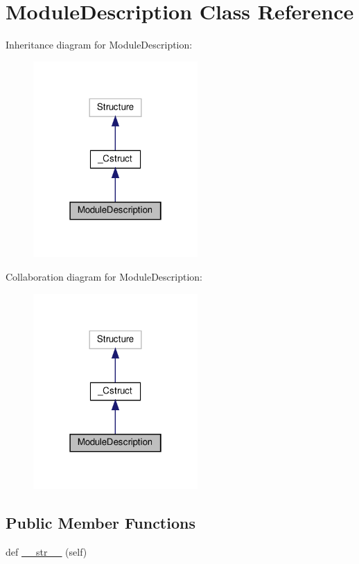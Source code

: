 \hypertarget{classvlc_1_1_module_description}{}\section{Module\+Description Class Reference}
\label{classvlc_1_1_module_description}


Inheritance diagram for Module\+Description\+:
\nopagebreak
\begin{figure}[H]
\begin{center}
\leavevmode
\includegraphics[width=178pt]{classvlc_1_1_module_description__inherit__graph}
\end{center}
\end{figure}


Collaboration diagram for Module\+Description\+:
\nopagebreak
\begin{figure}[H]
\begin{center}
\leavevmode
\includegraphics[width=178pt]{classvlc_1_1_module_description__coll__graph}
\end{center}
\end{figure}
\subsection*{Public Member Functions}
\begin{DoxyCompactItemize}
\item 
def \hyperlink{classvlc_1_1_module_description_a23e8041ce1015febe4fdace3225714f9}{\+\_\+\+\_\+str\+\_\+\+\_\+} (self)
\end{DoxyCompactItemize}


